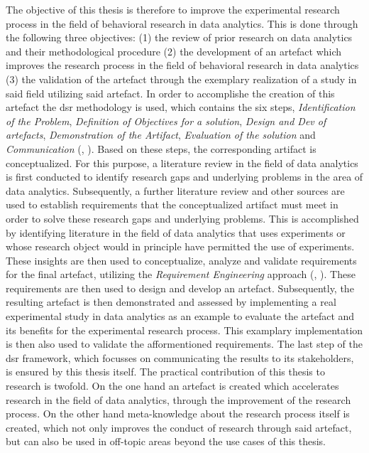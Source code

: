 The objective of this thesis is therefore to improve the experimental research process in the field of behavioral research in data analytics. This is done through the following three objectives: (1) the review of prior research on data analytics and their methodological procedure (2) the development of an artefact which improves the research process in the field of behavioral research in data analytics (3) the validation of the artefact through the exemplary realization of a study in said field utilizing said artefact. In order to accomplishe the creation of this artefact the \acf{dsr} methodology is used, which contains the six steps, \textit{Identification of the Problem}, \textit{Definition of Objectives for a solution}, \textit{Design and Dev of artefacts}, \textit{Demonstration of the Artifact}, \textit{Evaluation of the solution} and \textit{Communication} (\cite{Peffers.2006}, \cite{Dresch.2015}). Based on these steps, the corresponding artifact is conceptualized. For this purpose, a literature review in the field of data analytics is first conducted to identify research gaps and underlying problems in the area of data analytics. Subsequently, a further literature review and other sources are used to establish requirements that the conceptualized artifact must meet in order to solve these research gaps and underlying problems. This is accomplished by identifying literature in the field of data analytics that uses experiments or whose research object would in principle have permitted the use of experiments. These insights are then used to conceptualize, analyze and validate requirements for the final artefact, utilizing the \textit{Requirement Engineering} approach (\cite{Sommerville.2011}, \cite{SWEBOK.2004}). These requirements are then used to design and develop an artefact. Subsequently, the resulting artefact is then demonstrated and assessed by implementing a real experimental study in data analytics as an example to evaluate the artefact and its benefits for the experimental research process. This examplary implementation is then also used to validate the afformentioned requirements. The last step of the \ac{dsr} framework, which focusses on communicating the results to its stakeholders, is ensured by this thesis itself. The practical contribution of this thesis to research is twofold. On the one hand an artefact is created which accelerates research in the field of data analytics, through the improvement of the research process. On the other hand meta-knowledge about the research process itself is created, which not only improves the conduct of research through said artefact, but can also be used in off-topic areas beyond the use cases of this thesis.


